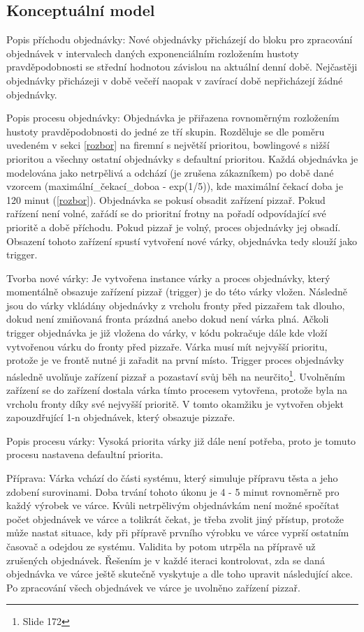 \documentclass[a4paper, 12pt]{article}[9.12.2013]
\begin{document}
\subsection{Konceptuální model} \label{koncepce:model}
Popis příchodu objednávky: Nové objednávky přicházejí do bloku pro zpracování objednávek v intervalech
daných exponenciálním rozložením hustoty pravděpodobnosti se střední hodnotou
závislou na aktuální denní době. Nejčastěji objednávky
přicházeji v době večeří naopak v zavírací době nepřicházejí žádné objednávky.

Popis procesu objednávky: Objednávka je přiřazena rovnoměrným rozložením hustoty pravděpodobnosti do
jedné ze tří skupin. Rozděluje se dle poměru uvedeném v sekci \ref{rozbor}
na firemní s největší prioritou, bowlingové s nižší prioritou a všechny ostatní
objednávky s defaultní prioritou. Každá objednávka je modelována jako
netrpělivá a odchází (je zrušena zákazníkem) po době dané vzorcem
(maximální\_čekací\_doboa - exp(1/5)), kde maximální čekací doba je 120 minut
(\ref{rozbor}). Objednávka se pokusí obsadit zařízení pizzař. Pokud
rařízení není volné, zařádí se do prioritní frotny na pořadí odpovídající své
prioritě a době příchodu. Pokud pizzař je volný, proces objednávky jej obsadí.
Obsazení tohoto zařízení spustí vytvoření nové várky, objednávka tedy slouží
jako trigger.

Tvorba nové várky: Je vytvořena instance várky a proces
objednávky, který momentálně obsazuje zařízení pizzař (trigger) je do této
várky vložen. Následně jsou do várky vkládány objednávky z vrcholu
fronty před pizzařem tak dlouho, dokud není zmiňovaná fronta prázdná anebo
dokud není várka plná. Ačkoli trigger objednávka je již vložena do várky,
v kódu pokračuje dále kde vloží vytvořenou várku do fronty před pizzaře.
Várka musí mít nejvyšší prioritu, protože je ve frontě nutné ji zařadit na
první místo. Trigger proces objednávky následně uvolňuje zařízení pizzař a
pozastaví svůj běh na neurčito\footnote{Slide 172}. Uvolněním zařízení se do
zařízení dostala várka tímto procesem vytovřena, protože byla na vrcholu
fronty díky své nejvyšší prioritě. V tomto okamžiku je vytvořen objekt
zapouzdřující 1-n objednávek, který obsazuje pizzaře.

Popis procesu várky: Vysoká priorita várky již dále není potřeba, proto je tomuto procesu nastavena
defaultní priorita.

Příprava: Várka vchází do části systému, který simuluje přípravu těsta a jeho zdobení
surovinami. Doba trvání tohoto úkonu je 4 - 5 minut
rovnoměrně pro každý výrobek ve várce. Kvůli netrpělivým objednávkám není
možné spočítat počet objednávek ve várce a tolikrát čekat, je třeba zvolit
jiný přístup, protože může nastat situace, kdy při přípravě prvního výrobku ve
várce vyprší ostatním časovač a odejdou ze systému. Validita by potom utrpěla
na přípravě už zrušených objednávek. Řešením je v každé iteraci kontrolovat,
zda se daná objednávka ve várce ještě skutečně vyskytuje a dle toho upravit
následující akce. Po zpracování všech objednávek ve várce je uvolněno zařízení
pizzař.
\end{document}
